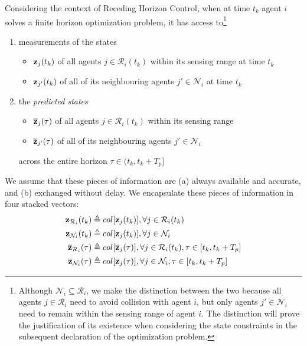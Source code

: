 \begin{gg_box}
\begin{assumption}
Considering the context of Receding Horizon Control, when
at time $t_k$ agent $i$ solves a finite horizon optimization problem, it has
access to\footnote{Although
  $\mathcal{N}_i \subseteq \mathcal{R}_i$, we make the distinction between
  the two because all agents $j \in \mathcal{R}_i$ need to avoid collision
  with agent $i$, but only agents $j' \in \mathcal{N}_i$ need to remain
  within the sensing range of agent $i$. The distinction will prove the
  justification of its existence when considering the state constraints
  in the subsequent declaration of the optimization problem.}

\begin{enumerate}
  \item measurements of the states
    \begin{itemize}
      \item $\bm{\mathbf{z}}_j(t_k)$ of all agents $j \in \mathcal{R}_i(t_k)$ within its sensing range at time $t_k$
      \item $\bm{\mathbf{z}}_{j'}(t_k)$ of all of its neighbouring agents $j' \in \mathcal{N}_i$ at time $t_k$
      \end{itemize}
    \item the \textit{predicted states}
      \begin{itemize}
        \item $\overline{\bm{\mathbf{z}}}_j(\tau)$ of all agents $j \in \mathcal{R}_i(t_k)$ within its sensing range
        \item $\overline{\bm{\mathbf{z}}}_{j'}(\tau)$ of all of its neighbouring agents $j' \in \mathcal{N}_i$
      \end{itemize}
      across the entire horizon $\tau \in (t_k, t_k + T_p]$
\end{enumerate}
\end{assumption}
\end{gg_box}
We assume that these pieces of information are (a) always available and
accurate, and (b) exchanged without delay. We encapsulate these pieces of
information in four stacked vectors:
\begin{subequations}
\begin{align}
  \bm{\mathbf{z}}_{\mathcal{R}_i}(t_k) &\triangleq col[\bm{\mathbf{z}}_j(t_k)], \forall j \in \mathcal{R}_i(t_k) \\
  \bm{\mathbf{z}}_{\mathcal{N}_i}(t_k) &\triangleq col[\bm{\mathbf{z}}_j(t_k)], \forall j \in \mathcal{N}_i \\
  \overline{\bm{\mathbf{z}}}_{\mathcal{R}_i}(\tau) &\triangleq col[\overline{\bm{\mathbf{z}}}_j(\tau)], \forall j \in \mathcal{R}_i(t_k), \tau \in [t_k, t_k + T_p] \\
  \overline{\bm{\mathbf{z}}}_{\mathcal{N}_i}(\tau) &\triangleq col[\overline{\bm{\mathbf{z}}}_j(\tau)], \forall j \in \mathcal{N}_i, \tau \in [t_k, t_k + T_p]
\end{align}
\end{subequations}

